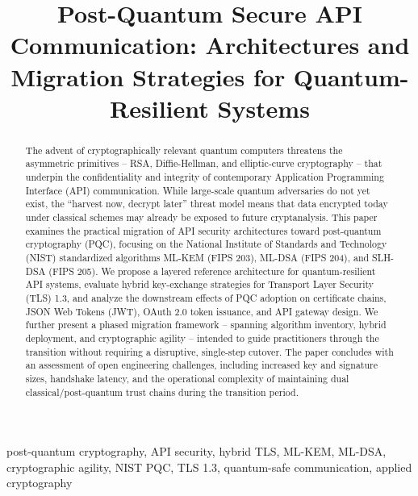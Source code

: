 \documentclass[conference]{IEEEtran}
\begin{document}
\title{Post-Quantum Secure API Communication: Architectures and Migration Strategies for Quantum-Resilient Systems}

\author{
}

\maketitle

\begin{abstract}
The advent of cryptographically relevant quantum computers threatens the
asymmetric primitives -- RSA, Diffie-Hellman, and elliptic-curve cryptography
-- that underpin the confidentiality and integrity of contemporary
Application Programming Interface (API) communication. While large-scale
quantum adversaries do not yet exist, the ``harvest now, decrypt later''
threat model means that data encrypted today under classical schemes may
already be exposed to future cryptanalysis. This paper examines the
practical migration of API security architectures toward post-quantum
cryptography (PQC), focusing on the National Institute of Standards and
Technology (NIST) standardized algorithms ML-KEM (FIPS 203), ML-DSA (FIPS
204), and SLH-DSA (FIPS 205). We propose a layered reference architecture for
quantum-resilient API systems, evaluate hybrid key-exchange strategies for
Transport Layer Security (TLS) 1.3, and analyze the downstream effects of
PQC adoption on certificate chains, JSON Web Tokens (JWT), OAuth 2.0 token
issuance, and API gateway design. We further present a phased migration
framework -- spanning algorithm inventory, hybrid deployment, and
cryptographic agility -- intended to guide practitioners through the
transition without requiring a disruptive, single-step cutover. The paper
concludes with an assessment of open engineering challenges, including
increased key and signature sizes, handshake latency, and the operational
complexity of maintaining dual classical/post-quantum trust chains during
the transition period.
\end{abstract}

\begin{IEEEkeywords}
post-quantum cryptography, API security, hybrid TLS, ML-KEM, ML-DSA,
cryptographic agility, NIST PQC, TLS 1.3, quantum-safe communication,
applied cryptography
\end{IEEEkeywords}
\end{document}
